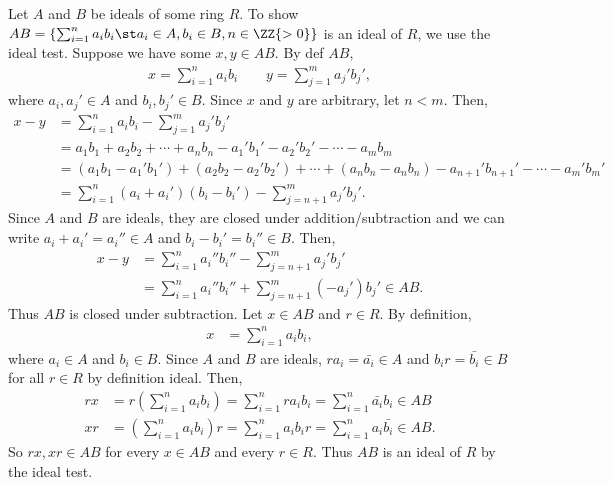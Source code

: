 \documentclass{article}
\begin{document}
\begin{solution} %
  Let \( A \) and \( B \) be ideals of some ring \( R \).
  To show \( AB = \left\{\sum_{i=1}^n a_ib_i \st a_i\in A, b_i\in B, n\in\ZZ{>0}\right\} \) is an ideal of \( R \), we use the ideal test.
  Suppose we have some \( x,y\in AB \).
  By def \( AB \), \begin{align*}
    x = \sum_{i=1}^{n} a_ib_i \qquad y = \sum_{j=1}^{m} a_j'b_j',
  \end{align*} where \( a_i,a_j'\in A \) and \( b_i,b_j'\in B \).
  Since \( x \) and \( y \) are arbitrary, let \( n<m \).
  Then, \begin{align*}
    x-y &= \sum_{i=1}^{n} a_ib_i - \sum_{j=1}^{m} a_j'b_j' \\
        &= a_1b_1 + a_2b_2 + \cdots + a_nb_n - a_1'b_1' - a_2'b_2' - \cdots - a_mb_m \\
        &= (a_1b_1-a_1'b_1') + (a_2b_2-a_2'b_2') + \cdots + (a_nb_n-a_nb_n) - a_{n+1}'b_{n+1}' - \cdots -a_m'b_m' \\
        &= \sum_{i=1}^n(a_i+a_i')(b_i-b_i') - \sum_{j=n+1}^{m} a_j'b_j'.
  \end{align*}
  Since \( A \) and \( B \) are ideals, they are closed under addition/subtraction and we can write \( a_i+a_i'=a_i''\in A \) and \( b_i-b_i' = b_i''\in B \).
  Then, \begin{align*}
    x-y &= \sum_{i=1}^{n}a_i''b_i'' - \sum_{j=n+1}^{m} a_j'b_j' \\
        &= \sum_{i=1}^{n}a_i''b_i'' + \sum_{j=n+1}^{m} (-a_j')b_j' \in AB.
  \end{align*}
  Thus \( AB \) is closed under subtraction.
  Let \( x\in AB \) and \( r\in R \). By definition, \begin{align*}
    x &= \sum_{i=1}^{n} a_ib_i,
  \end{align*} where \( a_i\in A \) and \( b_i\in B \).
  Since \( A \) and \( B \) are ideals, \( ra_i = \bar{a_i} \in A \) and \( b_i r = \bar{b_i} \in B \) for all \( r\in R \) by definition ideal.
  Then, \begin{align*}
    rx &= r\left(\sum_{i=1}^{n} a_ib_i\right) = \sum_{i=1}^{n} ra_ib_i = \sum_{i=1}^{n}\bar{a_i}b_i \in AB\\
    xr &= \left(\sum_{i=1}^{n} a_ib_i\right)r = \sum_{i=1}^{n} a_ib_ir = \sum_{i=1}^{n}a_i\bar{b_i} \in AB.
  \end{align*}
  So \( rx,xr\in AB \) for every \( x\in AB \) and every \( r\in R \). Thus \( AB \) is an ideal of \( R \) by the ideal test.
\end{solution}
\end{document}
